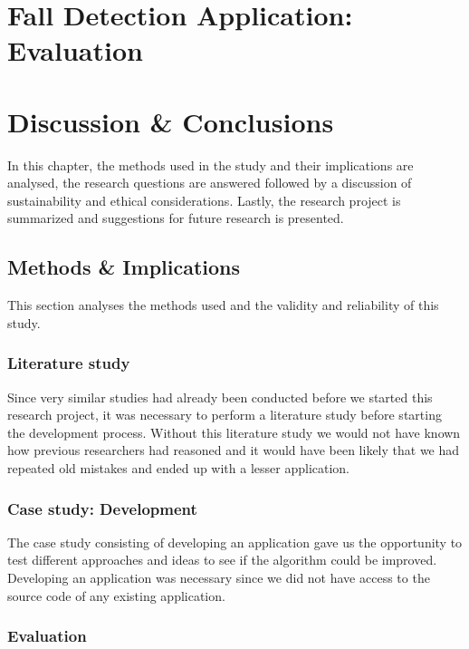 \documentclass[12pt, a4paper, onecolumn]{article}
\begin{document}
	
	\newpage
	
	\section{Fall Detection Application: Evaluation} \label{section:application-evaluation}
	
\newpage
	
	\section{Discussion \& Conclusions} \label{section:discussion}
	
	In this chapter, the methods used in the study and their implications are analysed, the research questions are answered followed by a discussion of sustainability and ethical considerations. Lastly, the research project is summarized and suggestions for future research is presented.
	
	\subsection{Methods \& Implications}
	
	This section analyses the methods used and the validity and reliability of this study.
	
	\subsubsection{Literature study}
	
	Since very similar studies had already been conducted before we started this research project, it was necessary to perform a literature study before starting the development process. Without this literature study we would not have known how previous researchers had reasoned and it would have been likely that we had repeated old mistakes and ended up with a lesser application.
	
	\subsubsection{Case study: Development}
	
	The case study consisting of developing an application gave us the opportunity to test different approaches and ideas to see if the algorithm could be improved. Developing an application was necessary since we did not have access to the source code of any existing application.
	
	\subsubsection{Evaluation}
	
\end{document}
